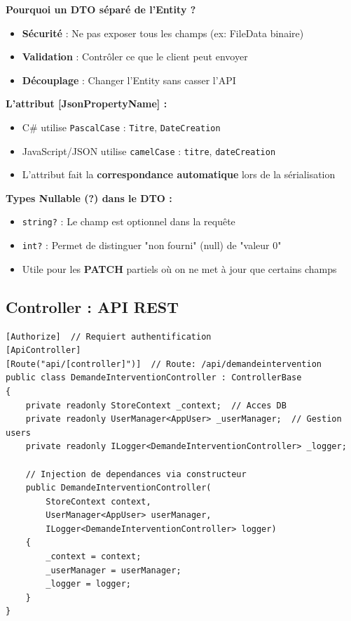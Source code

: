 \documentclass[12pt,a4paper]{article}
\begin{document}
\begin{infobox}[title={\faLightbulb\ Explication Complète du DTO}]
\textbf{Pourquoi un DTO séparé de l'Entity ?}
\begin{itemize}
    \item \textbf{Sécurité} : Ne pas exposer tous les champs (ex: FileData binaire)
    \item \textbf{Validation} : Contrôler ce que le client peut envoyer
    \item \textbf{Découplage} : Changer l'Entity sans casser l'API
\end{itemize}

\textbf{L'attribut [JsonPropertyName] :}
\begin{itemize}
    \item C\# utilise \texttt{PascalCase} : \texttt{Titre}, \texttt{DateCreation}
    \item JavaScript/JSON utilise \texttt{camelCase} : \texttt{titre}, \texttt{dateCreation}
    \item L'attribut fait la \textbf{correspondance automatique} lors de la sérialisation
\end{itemize}

\textbf{Types Nullable (?) dans le DTO :}
\begin{itemize}
    \item \texttt{string?} : Le champ est optionnel dans la requête
    \item \texttt{int?} : Permet de distinguer "non fourni" (null) de "valeur 0"
    \item Utile pour les \textbf{PATCH} partiels où on ne met à jour que certains champs
\end{itemize}
\end{infobox}

\newpage

\subsection{Controller : API REST}

\begin{lstlisting}[language=CSharp, caption=DemandeInterventionController.cs - Structure]
[Authorize]  // Requiert authentification
[ApiController]
[Route("api/[controller]")]  // Route: /api/demandeintervention
public class DemandeInterventionController : ControllerBase
{
    private readonly StoreContext _context;  // Acces DB
    private readonly UserManager<AppUser> _userManager;  // Gestion users
    private readonly ILogger<DemandeInterventionController> _logger;
    
    // Injection de dependances via constructeur
    public DemandeInterventionController(
        StoreContext context, 
        UserManager<AppUser> userManager,
        ILogger<DemandeInterventionController> logger)
    {
        _context = context;
        _userManager = userManager;
        _logger = logger;
    }
}
\end{lstlisting}
\end{document}
